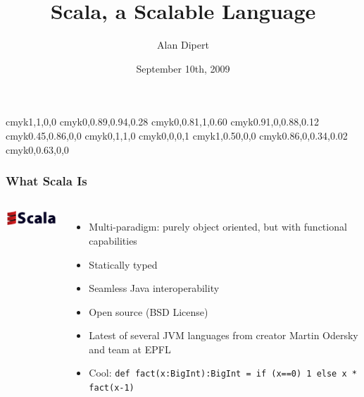           {cmyk}{1,1,0,0}
      {cmyk}{0,0.89,0.94,0.28}
         {cmyk}{0,0.81,1,0.60}
   {cmyk}{0.91,0,0.88,0.12}
        {cmyk}{0.45,0.86,0,0}
           {cmyk}{0,1,1,0}
         {cmyk}{0,0,0,1}
     {cmyk}{1,0.50,0,0}
      {cmyk}{0.86,0,0.34,0.02}
 {cmyk}{0,0.63,0,0}

\title{Scala, a Scalable Language} 
\author{Alan Dipert} 
\date{September 10th, 2009} 

 
\maketitle 

\begin{frame} 
\frametitle{What Scala Is}
\begin{columns}[c]
  \column{0.5in}
    \includegraphics[width=1.0in]{graphics/scala_logo.png} 
  \column{2.5in}
    \begin{itemize}
      \item<1-> Multi-paradigm: purely object oriented, but with functional capabilities
      \item<2-> Statically typed
      \item<3-> Seamless Java interoperability
      \item<4-> Open source (BSD License)
      \item<5-> Latest of several JVM languages from creator Martin Odersky and team at EPFL
      \item<6-> Cool: \tt\small{def fact(x:BigInt):BigInt = if (x==0) 1 else x * fact(x-1)}
    \end{itemize}
\end{columns}
\end{frame} 

